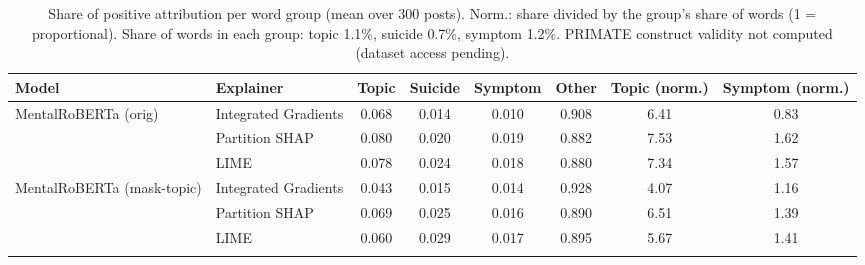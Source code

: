 \begin{table}[t]
\centering
\caption{Share of positive attribution per word group (mean over 300 posts). Norm.: share divided by the group's share of words (1 = proportional). Share of words in each group: topic 1.1\%, suicide 0.7\%, symptom 1.2\%. PRIMATE construct validity not computed (dataset access pending).}
\label{tab:mass}
\scriptsize
\setlength{\tabcolsep}{3pt}
\begin{tabular}{llcccccc}
\toprule
Model & Explainer & Topic & Suicide & Symptom & Other & Topic (norm.) & Symptom (norm.) \\
\midrule
MentalRoBERTa (orig) & Integrated Gradients & 0.068 & 0.014 & 0.010 & 0.908 & 6.41 & 0.83 \\
 & Partition SHAP & 0.080 & 0.020 & 0.019 & 0.882 & 7.53 & 1.62 \\
 & LIME & 0.078 & 0.024 & 0.018 & 0.880 & 7.34 & 1.57 \\
\addlinespace[2pt]
MentalRoBERTa (mask-topic) & Integrated Gradients & 0.043 & 0.015 & 0.014 & 0.928 & 4.07 & 1.16 \\
 & Partition SHAP & 0.069 & 0.025 & 0.016 & 0.890 & 6.51 & 1.39 \\
 & LIME & 0.060 & 0.029 & 0.017 & 0.895 & 5.67 & 1.41 \\
\addlinespace[2pt]
\bottomrule
\end{tabular}
\end{table}
